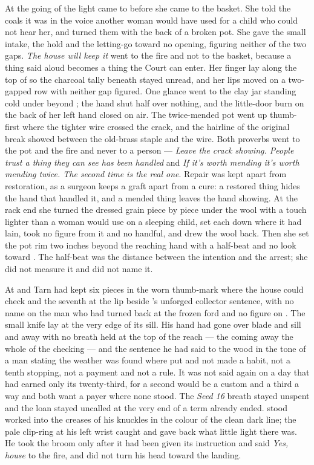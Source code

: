 At the going of the light  came to  before she came to the basket. She told the coals it was  in the voice another woman would have used for a child who could not hear her, and turned them with the back of a broken pot. She gave the small intake, the hold and the letting-go toward no opening, figuring neither of the two gaps. \emph{The house will keep it} went to the fire and not to the basket, because a thing said aloud becomes a thing the Court can enter. Her finger lay along the top of  so the charcoal tally beneath stayed unread, and her lips moved on a two-gapped row with neither gap figured. One glance went to the clay jar standing cold under  beyond ; the hand shut half over nothing, and the little-door burn on the back of her left hand closed on air. The twice-mended pot went up thumb-first where the tighter wire crossed the crack, and the hairline of the original break showed between the old-brass staple and the wire. Both proverbs went to the pot and the fire and never to a person --- \emph{Leave the crack showing. People trust a thing they can see has been handled} and \emph{If it's worth mending it's worth mending twice. The second time is the real one}. Repair was kept apart from restoration, as a surgeon keeps a graft apart from a cure: a restored thing hides the hand that handled it, and a mended thing leaves the hand showing. At the rack end she turned the dressed grain piece by piece under the wool with a touch lighter than a woman would use on a sleeping child, set each down where it had lain, took no figure from it and no handful, and drew the wool back. Then she set the pot rim two inches beyond the reaching hand with a half-beat and no look toward . The half-beat was the distance between the intention and the arrest; she did not measure it and did not name it.

At  and  Tarn had kept six pieces in the worn thumb-mark where the house could check and the seventh at the lip beside 's unforged collector sentence, with no name on the man who had turned back at the frozen ford and no figure on . The small knife lay at the very edge of its sill. His hand had gone over blade and sill and away with no breath held at the top of the reach --- the coming away the whole of the checking --- and the sentence he had said to the wood in the tone of a man stating the weather was found where put and not made a habit, not a tenth stopping, not a payment and not a rule. It was not said again on a day that had earned only its twenty-third, for a second would be a custom and a third a way and both want a payer where none stood. The \emph{Seed 16} breath stayed unspent and the loan stayed uncalled at the very end of a term already ended.  stood worked into the creases of his knuckles in the colour of the clean dark line; the pale clip-ring at his left wrist caught and gave back what little light there was. He took the broom only after it had been given its instruction and said \emph{Yes, house} to the fire, and did not turn his head toward the landing.

